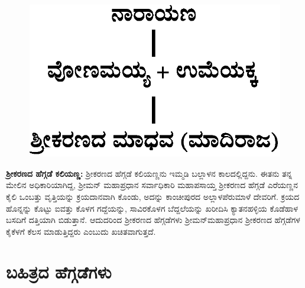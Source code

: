 \begin{figure}[H]
\includegraphics[scale=1.3]{images/chap3/chap3fig30.jpeg}
\end{figure}

\textbf{ಶ‍್ರೀಕರಣದ ಹೆಗ್ಗಡೆ ಕಲಿಯಣ್ಣ:} ಶ‍್ರೀಕರಣದ ಹೆಗ್ಗಡೆ ಕಲಿಯಣ್ಣನು ಇಮ್ಮಡಿ ಬಲ್ಲಾಳನ ಕಾಲದಲ್ಲಿದ್ದನು. ಈತನು ತನ್ನ ಮೇಲಿನ ಅಧಿಕಾರಿಯಾಗಿದ್ದ, ಶ‍್ರೀಮನ್​ ಮಹಾಪ್ರಧಾನ ಸರ್ವಾಧಿಕಾರಿ ಮಹಾಪಸಾಯ್ತ ಶ‍್ರೀಕರಣದ ಹೆಗ್ಗಡೆ ಎರೆಯಣ್ಣನ ಕೈಲಿ ಒಂಬತ್ತು ವೃತ್ತಿಯನ್ನು ಕ್ರಯದಾನವಾಗಿ ಕೊಂಡು, ಅದನ್ನು ಕಾಂಚೀಪುರದ ಅಲ್ಲಾಳಪೆರುಮಾಳೆ ದೇವರಿಗೆ. ಕ್ರಯದ ಹೊನ್ನನ್ನು ಕೊಟ್ಟು ಐವತ್ತು ಕೊಳಗ ಗದ್ದೆಯನ್ನು, ಸಾವಿರಕೊಳಗ ಬೆದ್ದಲೆಯನ್ನು ಖರೀದಿಸಿ ಕ್ಯಾತನಹಳ್ಳಿಯ ಕೊಡೆಹಾಳ ಬಸದಿಗೆ ದತ್ತಿಯಾಗಿ ಬಿಡುತ್ತಾನೆ. ಆದುದರಿಂದ ಶ‍್ರೀಕರಣದ ಹೆಗ್ಗಡೆಗಳು ಶ‍್ರೀಮನ್​ಮಹಾಪ್ರಧಾನ ಶ‍್ರೀಕರಣದ ಹೆಗ್ಗಡೆಗಳ ಕೈಕೆಳಗೆ ಕೆಲಸ ಮಾಡುತ್ತಿದ್ದರು ಎಂಬುದು ಖಚಿತವಾಗುತ್ತದೆ.


\section*{ಬಹಿತ್ರದ ಹೆಗ್ಗಡೆಗಳು}

